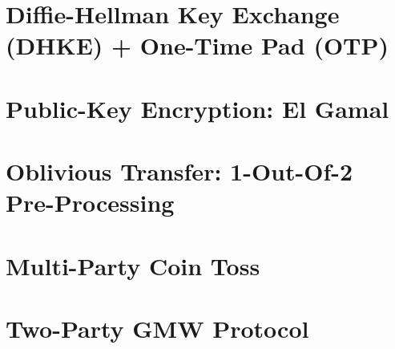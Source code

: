 \documentclass[11pt,hidelinks]{article}
\begin{document}
\section{Diffie-Hellman Key Exchange (DHKE) + One-Time Pad (OTP)}\label{sec:dhke_otp}


\section{Public-Key Encryption: El Gamal}\label{sec:el_gamal}


%

\section{Oblivious Transfer: 1-Out-Of-2 Pre-Processing}\label{sec:ot_pre}


\section{Multi-Party Coin Toss}\label{sec:coin}


\section{Two-Party GMW Protocol}\label{sec:gmw}

\end{document}

